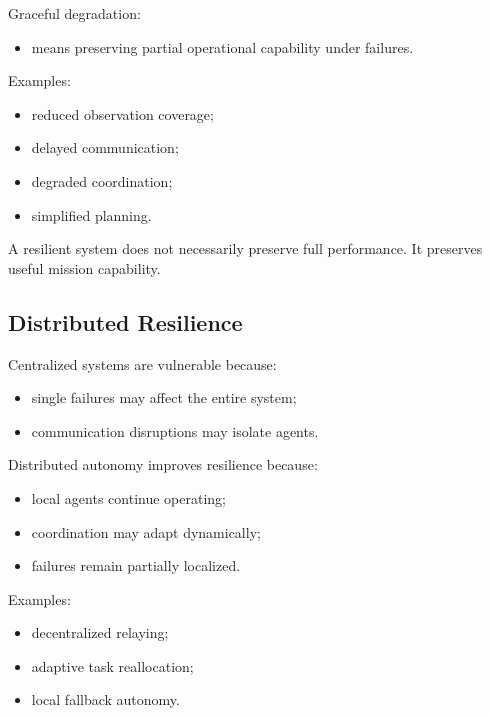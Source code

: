 \documentclass[10pt,a4paper,twocolumn]{article}
\begin{document}
Graceful degradation:
\begin{itemize}
    \item means preserving partial operational capability under failures.
\end{itemize}

Examples:
\begin{itemize}
    \item reduced observation coverage;
    \item delayed communication;
    \item degraded coordination;
    \item simplified planning.
\end{itemize}

\begin{keybox}
    A resilient system does not necessarily preserve full performance. It preserves useful mission capability.
\end{keybox}


\subsection{Distributed Resilience}

Centralized systems are vulnerable because:
\begin{itemize}
    \item single failures may affect the entire system;
    \item communication disruptions may isolate agents.
\end{itemize}

Distributed autonomy improves resilience because:
\begin{itemize}
    \item local agents continue operating;
    \item coordination may adapt dynamically;
    \item failures remain partially localized.
\end{itemize}

Examples:
\begin{itemize}
    \item decentralized relaying;
    \item adaptive task reallocation;
    \item local fallback autonomy.
\end{itemize}
\end{document}
